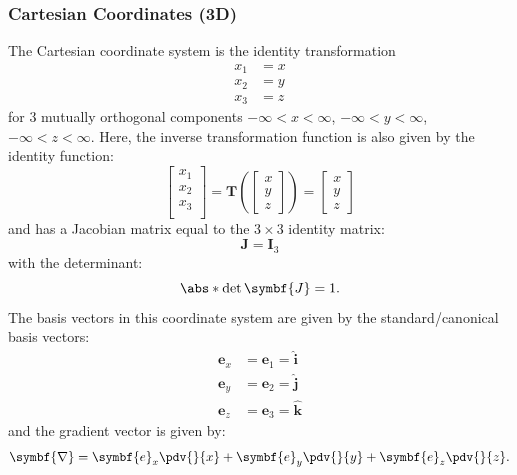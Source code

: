 \documentclass{article}
\begin{document}
\subsubsection{Cartesian Coordinates (3D)}
The Cartesian coordinate system is the identity transformation
\begin{align*}
    x_1 & = x \\
    x_2 & = y \\
    x_3 & = z
\end{align*}
for \(3\) mutually orthogonal components \(-\infty < x < \infty\),
\(-\infty < y < \infty\), \(-\infty < z < \infty\). Here, the inverse
transformation function is also given by the identity function:
\begin{equation*}
    \begin{bmatrix}
        x_1 \\
        x_2 \\
        x_3 \\
    \end{bmatrix}
    = \symbf{T}\left(
    \begin{bmatrix}
        x \\
        y \\
        z
    \end{bmatrix}
    \right) =
    \begin{bmatrix}
        x \\
        y \\
        z
    \end{bmatrix}
\end{equation*}
and has a Jacobian matrix equal to the \(3 \times 3\) identity matrix:
\begin{equation*}
    \symbf{J} = \symbf{I}_3
\end{equation*}
with the determinant:
\begin{equation*}
    \abs*{\det{\symbf{J}}} = 1.
\end{equation*}
The basis vectors in this coordinate system are given by the
standard/canonical basis vectors:
\begin{align*}
    \symbf{e}_x & = \symbf{e}_1 = \hat{\symbf{i}} \\
    \symbf{e}_y & = \symbf{e}_2 = \hat{\symbf{j}} \\
    \symbf{e}_z & = \symbf{e}_3 = \hat{\symbf{k}}
\end{align*}
and the gradient vector is given by:
\begin{equation*}
    \symbf{\nabla} = \symbf{e}_x \pdv{}{x} + \symbf{e}_y \pdv{}{y} + \symbf{e}_z \pdv{}{z}.
\end{equation*}
\end{document}
